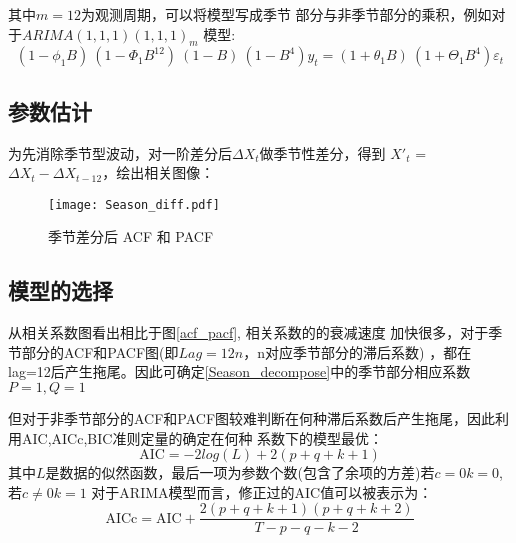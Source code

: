 \documentclass[12pt,a4paper]{nmmcm}
\begin{document}
其中\(m=12\)为观测周期，可以将模型写成季节
部分与非季节部分的乘积，例如对于\(ARIMA(1,1,1)(1,1,1)_m\)
模型:
\begin{equation}
  (1 - \phi_{1}B)~(1 - \Phi_{1}B^{12})~(1 - B)~(1 - B^{4})y_{t} = (1 + \theta_{1}B)~ (1 + \Theta_{1}B^{4})\varepsilon_{t}
\end{equation}

 \subsection{参数估计}
 为先消除季节型波动，对一阶差分后\(\Delta X_t\)做季节性差分，得到
 \(X'_{t}\) = \(\Delta X_t-\Delta X_{t-12}\)，绘出相关图像：
 \begin{figure}[H] %
  \centering %
  \texttt{[image: Season\_diff.pdf]} %
  \caption{季节差分后 ACF 和 PACF} %
  \label{season_diff} %
  \end{figure}
  \subsection{模型的选择}
  从相关系数图看出相比于图\ref{acf_pacf}, 相关系数的的衰减速度
  加快很多，对于季节部分的ACF和PACF图(即\(Lag=12n\)，n对应季节部分的滞后系数)
  ，都在lag=12后产生拖尾。因此可确定\ref{Season_decompose}中的季节部分相应系数\(P=1 , Q=1\)

  但对于非季节部分的ACF和PACF图较难判断在何种滞后系数后产生拖尾，因此利用AIC,AICc,BIC准则定量的确定在何种
  系数下的模型最优：
  \begin{equation*}
    \text{AIC} = -2log(L) + 2(p+q+k+1)
  \end{equation*}
  其中\(L\)是数据的似然函数，最后一项为参数个数(包含了余项的方差)若\(c=0\)\(k=0\),若\(c\neq0\)\(k=1\)
  对于ARIMA模型而言，修正过的AIC值可以被表示为\cite{Rob}：
  \begin{equation*}
    \text{AICc} = \text{AIC} + \frac{2(p+q+k+1)(p+q+k+2)}{T-p-q-k-2}
  \end{equation*}
\end{document}
